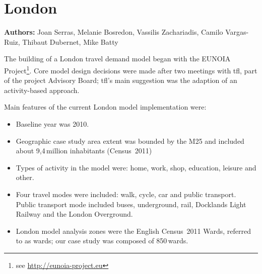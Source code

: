 \chapter{London}
\label{ch:london}
\hfill \textbf{Authors:} Joan Serras, Melanie Bosredon, Vassilis Zachariadis, Camilo Vargas-Ruiz, Thibaut Dubernet, Mike Batty


The building of a London travel demand model began with the EUNOIA Project\footnote{see \url{http://eunoia-project.eu}}. 
Core model design decisions were made after two meetings with \gls{tfl}, part of the project Advisory Board; 
\gls{tfl}'s main suggestion was the adaption of an activity-based approach.

Main features of the current London model implementation were:
%
\begin{itemize}\styleItemize
\item     Baseline year was 2010.
\item	Geographic case study area extent was bounded by the M25 and included about 9,4\,million inhabitants (Census~2011)
\item	Types of activity in the model were: home, work, shop, education, leisure and other.
\item	Four travel modes were included: walk, cycle, car and public transport. Public transport mode included buses, underground, rail, Docklands Light Railway and the London Overground.
\item	 London model analysis zones were the English Census~2011 Wards, referred to as wards; our case study was composed of 850\,wards.
\end{itemize}
%

